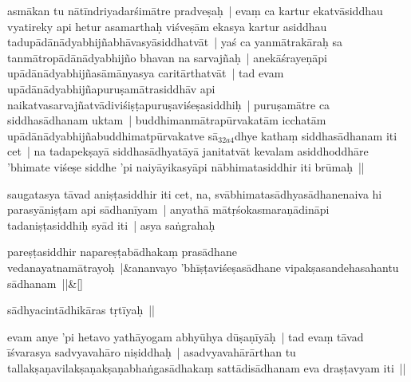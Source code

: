 \documentclass[article,12pt,a4paper]{memoir}%
\newcounter{parCount}
\begin{document}
	  \pstart \leavevmode%
	\label{thakur75-56.24}asmākan tu nātīndriyadarśimātre pradveṣaḥ | evaṃ ca kartur ekatvāsiddhau vyatireky api hetur asamarthaḥ viśveṣām ekasya kartur asiddhau tadupādānādyabhijñabhāvasyāsiddhatvāt | yaś ca yanmātrakāraḥ sa tanmātropādānādyabhijño bhavan na sarvajñaḥ | anekāśrayeṇāpi upādānādyabhijñasāmānyasya caritārthatvāt | tad evam upādānādyabhijñapuruṣamātrasiddhāv api naikatvasarvajñatvādiviśiṣṭapuruṣaviśeṣasiddhiḥ | puruṣamātre ca siddhasādhanam uktam | buddhimanmātrapūrvakatām icchatām upādānādyabhijñabuddhimatpūrvakatve sā{\tiny $_{32a4}$}dhye kathaṃ \label{ratnakīrtinibandhāvali__36r1NMNKPK8I8K079OIC2E8BVU5}siddhasādhanam\label{ratnakīrtinibandhāvali__36r1NMNKPKAMZXOQ29O4V14D9F6} iti cet | na tadapekṣayā siddhasādhyatāyā janitatvāt kevalam asiddhoddhāre 'bhimate viśeṣe siddhe 'pi naiyāyikasyāpi nābhimatasiddhir iti brūmaḥ ||
	{}
	\pend%
      

	  \pstart \leavevmode%
	\label{thakur75-57.3}saugatasya tāvad aniṣṭasiddhir iti cet, na, svābhimatasādhyasādhanenaiva hi parasyāniṣṭam api sādhanīyam | anyathā mātṛśokasmaraṇādināpi tadaniṣṭasiddhiḥ syād iti | asya saṅgrahaḥ
	{}
	\pend%
      
	    
	    \stanza[\smallbreak]
	  pareṣṭasiddhir napareṣṭabādhakaṃ prasādhane vedanayatnamātrayoḥ |&ananvayo 'bhīṣṭaviśeṣasādhane vipakṣasandehasahantu sādhanam ||\&[\smallbreak]
	  
	  
	  \label{īsd-sādhyacintā}
	  
	

	  \pstart \leavevmode%
	sādhyacintādhikāras tṛtīyaḥ ||
	{}
	\pend%
      

	  \pstart \leavevmode%
	\label{thakur75-57.11}evam anye 'pi hetavo yathāyogam abhyūhya dūṣaṇīyāḥ | tad evaṃ tāvad īśvarasya sadvyavahāro niṣiddhaḥ | asadvyavahārārthan tu tallakṣaṇavilakṣaṇakṣaṇabhaṅgasādhakaṃ sattādisādhanam eva draṣṭavyam iti ||\leavevmode{}\label{RNAms_32B1}
	{}
	\pend%
      
\end{document}
